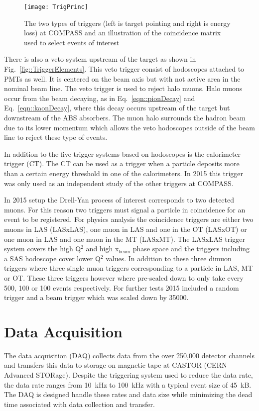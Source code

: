 \begin{figure}[h!t]
  \centering
  \texttt{[image: TrigPrinc]}
  \caption{The two types of triggers (left is target pointing and right is
    energy loss) at COMPASS and an illustration of the coincidence matrix used
    to select events of interest}
  \label{fig::TrigPrinc}
\end{figure}

There is also a veto system upstream of the target as shown in
Fig.~\ref{fig::TriggerElements}.  This veto trigger consist of hodoscopes
attached to PMTs as well.  It is centered on the beam axis but with not active
area in the nominal beam line.  The veto trigger is used to reject halo muons.
Halo muons occur from the beam decaying, as in Eq.~\ref{eqn::pionDecay} and
Eq.~\ref{eqn::kaonDecay}, where this decay occurs upstream of the target but
downstream of the ABS absorbers.  The muon halo surrounds the hadron beam due to
its lower momentum which allows the veto hodoscopes outside of the beam line to
reject these type of events.

In addition to the five trigger systems based on hodoscopes is the calorimeter
trigger (CT).  The CT can be used as a trigger when a particle deposits more
than a certain energy threshold in one of the calorimeters.  In 2015 this
trigger was only used as an independent study of the other triggers at
COMPASS. \par

In 2015 setup the Drell-Yan process of interest corresponds to two detected
muons.  For this reason two triggers must signal a particle in coincidence for
an event to be registered.  For physics analysis the coincidence triggers are
either two muons in LAS (LASxLAS), one muon in LAS and one in the OT (LASxOT) or
one muon in LAS and one muon in the MT (LASxMT).  The LASxLAS trigger system
covers the high Q$^2$ and high x$_{\mathrm{beam}}$ phase space and the triggers
including a SAS hodoscope cover lower Q$^2$ values.  In addition to these three
dimuon triggers where three single muon triggers corresponding to a particle in
LAS, MT or OT.  These three triggers however where pre-scaled down to only take
every 500, 100 or 100 events respectively.  For further tests 2015 included a
random trigger and a beam trigger which was scaled down by 35000.


\section{Data Acquisition}
The data acquisition (DAQ) collects data from the over 250,000 detector channels
and transfers this data to storage on magnetic tape at CASTOR (CERN Advanced
STORage).  Despite the triggering system used to reduce the data rate, the data
rate ranges from 10~kHz to 100~kHz with a typical event size of 45~kB.  The DAQ
is designed handle these rates and data size while minimizing the dead time
associated with data collection and transfer. \par

